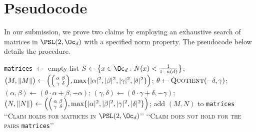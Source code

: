 \documentclass[runningheads]{llncs}
\begin{document}
\section{Pseudocode}

In our submission, we prove two claims by employing an exhaustive search of matrices in \(\PSL(2,\Oc_d)\) with a specified norm property. The pseudocode below details the procedure.
\begin{algorithm}
\begin{algorithmic}
\State \texttt{matrices} \(\leftarrow\) empty list 
\State \(S\leftarrow \bigl\{x\in \Oc_d : N(x) < \tfrac{1}{1-\kappa(d)}\bigr\}\); 
\State \(\bigl( M, \|M\|\bigr)  \leftarrow \left( \begin{psmallmatrix} \alpha & \beta \\ \gamma & \delta \end{psmallmatrix} , \max\{|\alpha|^2, |\beta|^2, |\gamma|^2, |\delta|^2\}\right)\); 
\State \(\theta \leftarrow \textsc{Quotient}(-\delta, \gamma)\);  %
\State \((\alpha,\beta) \leftarrow (\theta \cdot \alpha + \beta, -\alpha)\); 
\State \((\gamma, \delta) \leftarrow (\theta \cdot \gamma + \delta, -\gamma)\);
\State \(\bigl( N, \|N\| \bigr)  \leftarrow \left(\begin{psmallmatrix} \alpha & \beta \\ \gamma & \delta \end{psmallmatrix}, \max\{|\alpha|^2, |\beta|^2, |\gamma|^2, |\delta|^2\} \right)  \); 
\State add \((M, N)\) to \texttt{matrices} %
\EndIf
\EndFor
{}
\State \Return \textsc{\lq\lq Claim holds for matrices in \(\PSL(2,\Oc_d)\)\rq\rq}
\Else
\State \Return \textsc{\lq\lq Claim does not hold for the pairs} \texttt{matrices}\rq\rq
\EndIf
\caption{Search and verification of claims in \(\PSL(2,\Oc_d)\).\label{alg:cap}}
\end{algorithmic}
\end{algorithm}
\end{document}
